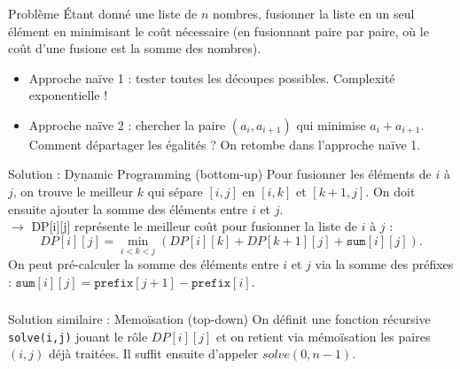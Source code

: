 \begin{frame}
    \frametitle{\problemtitle}
    \begin{block}{Problème}
        Étant donné une liste de $n$ nombres, fusionner la liste en un seul élément en minimisant le coût nécessaire (en fusionnant paire par paire, où le coût d'une fusione est la somme des nombres).
    \end{block}
    \pause
    \begin{itemize}
        \item Approche naïve 1 : tester toutes les découpes possibles. Complexité exponentielle ! \pause
        \item Approche naïve 2 : chercher la paire $(a_i,a_{i+1})$ qui minimise $a_i+a_{i+1}$. Comment départager les égalités ? On retombe dans l'approche naïve 1.
    \end{itemize}
    \pause
    \begin{block}{Solution : Dynamic Programming (bottom-up)}
        Pour fusionner les éléments de $i$ à $j$, on trouve le meilleur $k$ qui sépare $[i,j]$ en $[i,k]$ et $[k+1,j]$. On doit ensuite ajouter la somme des éléments entre $i$ et $j$. \\ \pause
        $\rightarrow$ DP[i][j] représente le meilleur coût pour fusionner la liste de $i$ à $j$ :
        \[
        DP[i][j] = \min_{i<k<j}(DP[i][k] + DP[k+1][j] + \texttt{sum}[i][j]).
        \]
        \pause
        On peut pré-calculer la somme des éléments entre $i$ et $j$ via la somme des préfixes : $\texttt{sum}[i][j] = \texttt{prefix}[j+1] - \texttt{prefix}[i]$.
    \end{block}
\end{frame}

\begin{frame}
    \frametitle{\problemtitle}
    \begin{block}{Solution similaire : Memo\"isation (top-down)}
       On définit une fonction récursive \texttt{solve(i,j)} jouant le rôle $DP[i][j]$ et on retient via mémoïsation les paires $(i,j)$ déjà traitées. Il suffit ensuite d'appeler $solve(0,n-1)$.
    \end{block}

\end{frame}